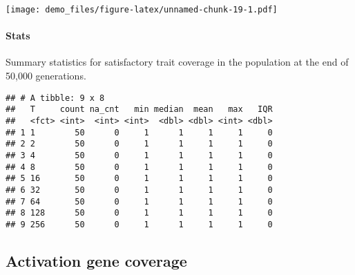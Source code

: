 \documentclass[]{book}
\newenvironment{Shaded}{\begin{snugshade}}{\end{snugshade}}
\newcommand{\DataTypeTok}[1]{\textcolor[rgb]{0.13,0.29,0.53}{#1}}
\newcommand{\KeywordTok}[1]{\textcolor[rgb]{0.13,0.29,0.53}{\textbf{#1}}}
\newcommand{\NormalTok}[1]{#1}
\newcommand{\OperatorTok}[1]{\textcolor[rgb]{0.81,0.36,0.00}{\textbf{#1}}}
\newcommand{\OtherTok}[1]{\textcolor[rgb]{0.56,0.35,0.01}{#1}}
\newcommand{\StringTok}[1]{\textcolor[rgb]{0.31,0.60,0.02}{#1}}
\let\oldparagraph\paragraph
\renewcommand{\paragraph}[1]{\oldparagraph{#1}\mbox{}}
\begin{document}
\texttt{[image: demo\_files/figure-latex/unnamed-chunk-19-1.pdf]}

\hypertarget{stats-20}{%
\paragraph{Stats}\label{stats-20}}

Summary statistics for satisfactory trait coverage in the population at the end of 50,000 generations.

\begin{Shaded}
\end{Shaded}

\begin{verbatim}
## # A tibble: 9 x 8
##   T     count na_cnt   min median  mean   max   IQR
##   <fct> <int>  <int> <int>  <dbl> <dbl> <int> <dbl>
## 1 1        50      0     1      1     1     1     0
## 2 2        50      0     1      1     1     1     0
## 3 4        50      0     1      1     1     1     0
## 4 8        50      0     1      1     1     1     0
## 5 16       50      0     1      1     1     1     0
## 6 32       50      0     1      1     1     1     0
## 7 64       50      0     1      1     1     1     0
## 8 128      50      0     1      1     1     1     0
## 9 256      50      0     1      1     1     1     0
\end{verbatim}

\hypertarget{activation-gene-coverage-2}{%
\subsection{Activation gene coverage}\label{activation-gene-coverage-2}}
\end{document}
